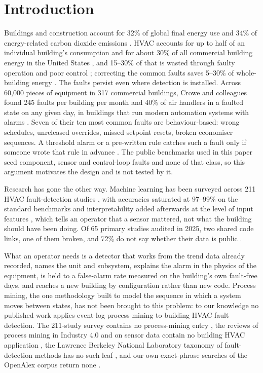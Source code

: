 \documentclass[11pt,letterpaper]{article}
\begin{document}
\section{Introduction}
Buildings and construction account for 32\% of global final energy use and 34\% of energy-related carbon dioxide emissions \cite{unep2025gsr}. HVAC accounts for up to half of an individual building's consumption \cite{bi2024aihvacreview} and for about 30\% of all commercial building energy in the United States \cite{doe2017hvacsavings}, and 15--30\% of that is wasted through faulty operation and poor control \cite{katipamula2005fddreview1,bi2024aihvacreview}; correcting the common faults saves 5--30\% of whole-building energy \cite{pritoni2022faultcorrection,bi2024aihvacreview}. The faults persist even where detection is installed. Across 60{,}000 pieces of equipment in 317 commercial buildings, Crowe and colleagues found 245 faults per building per month and 40\% of air handlers in a faulted state on any given day, in buildings that run modern automation systems with alarms \cite{crowe2023faultprevalence}. Seven of their ten most common faults are behaviour-based: wrong schedules, unreleased overrides, missed setpoint resets, broken economiser sequences. A threshold alarm or a pre-written rule \cite{schein2006apar} catches such a fault only if someone wrote that rule in advance \cite{gunay2022logicfaults}. The public benchmarks used in this paper seed component, sensor and control-loop faults and none of that class, so this argument motivates the design and is not tested by it.

Research has gone the other way. Machine learning has been surveyed across 211 HVAC fault-detection studies \cite{bi2024aihvacreview}, with accuracies saturated at 97--99\% on the standard benchmarks \cite{tun2021hybridrfsvm,prince2025improved1dcnnlstm} and interpretability added afterwards at the level of input features \cite{deng2024afgcn,chen2023interpretablereview}, which tells an operator that a sensor mattered, not what the building should have been doing. Of 65 primary studies audited in 2025, two shared code links, one of them broken, and 72\% do not say whether their data is public \cite{mukhtar2025reproducibility}.

What an operator needs is a detector that works from the trend data already recorded, names the unit and subsystem, explains the alarm in the physics of the equipment, is held to a false-alarm rate measured on the building's own fault-free days, and reaches a new building by configuration rather than new code. Process mining, the one methodology built to model the sequence in which a system moves between states, has not been brought to this problem: to our knowledge no published work applies event-log process mining to building HVAC fault detection. The 211-study survey contains no process-mining entry \cite{bi2024aihvacreview}, the reviews of process mining in Industry 4.0 and on sensor data contain no building HVAC application \cite{akhramovich2024pmindustry40,brzychczy2025pmsensorreview}, the Lawrence Berkeley National Laboratory taxonomy of fault-detection methods has no such leaf \cite{granderson2017fddtoolsurvey}, and our own exact-phrase searches of the OpenAlex corpus return none \cite{priem2022openalex}.
\end{document}
